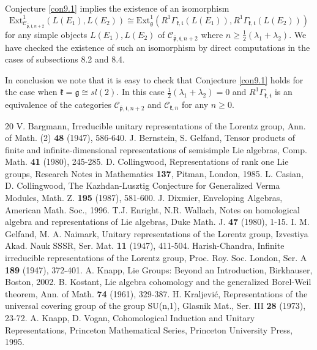 \documentclass[11pt]{amsart}
\newcounter{theorem}
\renewcommand{\tt}{\mathfrak{t}}
\newcommand{\kk}{\mathfrak{k}}
\newcommand{\pp}{\mathfrak{p}}
\renewcommand{\gg}{\mathfrak{g}}
\newcommand{\refcon}[1]{Conjecture \ref{#1}}
\newcommand{\Ext}{\mathrm{Ext}}
\begin{document}
 \refcon{con9.1} implies the existence of an isomorphism $$\Ext^1_{\mathcal{C}_{\bar{\pp},\tt,n+2}}(L(E_1),L(E_2))\cong\Ext^1_\gg(R^1\Gamma_{\kk,\tt}(L(E_1)),R^1\Gamma_{\kk,\tt}(L(E_2)))$$ for any simple objects $L(E_1),L(E_2)$ of $\mathcal{C}_{\bar{\pp},\tt,n+2}$ where $n\geq\frac{1}{2}(\lambda_1+\lambda_2)$. We have checked the existence of such an isomorphism by direct computations in the cases of subsections 8.2 and 8.4.

In conclusion we note that it is easy to check that \refcon{con9.1} holds for the case when $\kk=\gg\cong sl(2)$. In this case $\frac{1}{2}(\lambda_1+\lambda_2)=0$ and $R^1\Gamma_{\kk,\tt}$ is an equivalence of the categories $\mathcal{C}_{\bar{\pp},\tt,n+2}$ and $\mathcal{C}_{\kk,n}$ for any $n\geq 0$.
\newpage

\begin{thebibliography}{20}
 V. Bargmann, Irreducible unitary representations of the Lorentz group, Ann. of Math. (2) \textbf{48} (1947), 586-640.
 J. Bernstein, S. Gelfand, Tensor products of finite and infinite-dimensional representations of semisimple Lie algebras, Comp. Math. \textbf{41} (1980), 245-285.
 D. Collingwood, Representations of rank one Lie groups, Research Notes in Mathematics \textbf{137}, Pitman, London, 1985.
 L. Casian, D. Collingwood, The Kazhdan-Lusztig Conjecture for Generalized Verma Modules, Math. Z. \textbf{195} (1987), 581-600.
 J. Dixmier, Enveloping Algebras, American Math. Soc., 1996.
 T.J. Enright, N.R. Wallach, Notes on homological algebra and representations of Lie algebras, Duke Math. J. \textbf{47} (1980), 1-15.
 I. M. Gelfand, M. A. Naimark, Unitary representations of the Lorentz group, Izvestiya Akad. Nauk SSSR, Ser. Mat. \textbf{11} (1947), 411-504.
 Harish-Chandra, Infinite irreducible representations of the Lorentz group, Proc. Roy. Soc. London, Ser. A \textbf{189} (1947), 372-401.
 A. Knapp, Lie Groups: Beyond an Introduction, Birkhauser, Boston, 2002.
 B. Kostant, Lie algebra cohomology and the generalized Borel-Weil theorem, Ann. of Math. \textbf{74} (1961), 329-387.
 H. Kraljevi\'{c}, Representations of the universal covering group of the group SU(n,1), Glasnik Mat., Ser. III \textbf{28} (1973), 23-72.
 A. Knapp, D. Vogan, Cohomological Induction and Unitary Representations, Princeton Mathematical Series, Princeton University Press, 1995.

\end{thebibliography}
\end{document}
